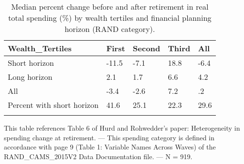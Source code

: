 \begin{table}[tbp] \centering
{}

\caption{Median percent change before and after retirement in real total spending (\%) by wealth tertiles and financial planning horizon (RAND category).}
\begin{tabularx}{\textwidth}{lCCCC}

\toprule
{Wealth\_Tertiles}&{First}&{Second}&{Third}&{All} \tabularnewline
\midrule\addlinespace[1.5ex]
Short horizon&-11.5&-7.1&18.8&-6.4 \tabularnewline
Long horizon&2.1&1.7&6.6&4.2 \tabularnewline
All&-3.4&-2.6&7.2&.2 \tabularnewline
Percent with short horizon&41.6&25.1&22.3&29.6 \tabularnewline
\bottomrule \addlinespace[1.5ex]

\end{tabularx}
\begin{flushleft}
\footnotesize This table references Table 6 of Hurd and Rohwedder's paper: Heterogeneity in spending change at retirement. \linebreak --- \linebreak This spending category is defined in accordance with page 9 (Table 1: Variable Names Across Waves) of the RAND\_CAMS\_2015V2 Data Documentation file. \linebreak --- \linebreak N = 919.
\end{flushleft}
\end{table}
